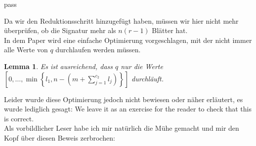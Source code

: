 pass\documentclass[a4paper,10pt,ngerman]{scrartcl}
\newtheorem{lemma}[satz]{Lemma}
\begin{document}
    Da wir den Reduktionsschritt hinzugefügt haben, müssen wir hier nicht mehr überprüfen, ob die Signatur mehr als $n (r - 1)$ Blätter hat. \\
    In dem Paper\autocite{golin_dynamic_1998} wird eine einfache Optimierung vorgeschlagen, mit der nicht immer alle Werte von $q$ durchlaufen werden müssen.
    \begin{lemma}
        \label{lem:reader_1}
        Es ist ausreichend, dass $q$ nur die Werte $\left[0, \dots, \min\left\{l_1, n - \left(m + \sum^{c_2}_{j=1} l_j\right)\right\}\right]$ durchläuft.
    \end{lemma}
    Leider wurde diese Optimierung jedoch nicht bewiesen oder näher erläutert, es wurde lediglich gesagt: \glqq We leave it as an exercise for the reader to check that this is correct.\grqq \\
    Als vorbildlicher Leser habe ich mir natürlich die Mühe gemacht und mir den Kopf über diesen Beweis zerbrochen:
\end{document}
